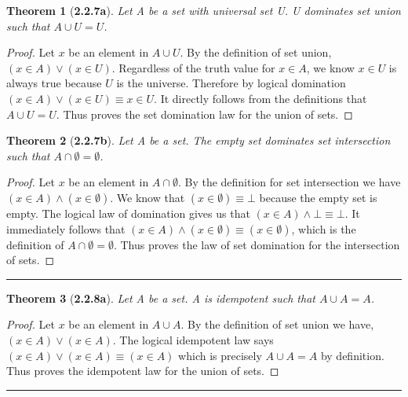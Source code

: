 \documentclass[a4paper, 12pt]{article}
\theoremstyle{plain}
\newtheorem*{theorem*}{Theorem}
\begin{document}
\begin{theorem*}[\textbf{2.2.7a}]
    Let A be a set with universal set U. U dominates set union such that $A \cup U = U$.
\end{theorem*}

\begin{proof}
    Let $x$ be an element in $A \cup U$. By the definition of set union, \newline 
    $(x \in A) \lor (x \in U)$. Regardless of the truth value for $x \in A$, we know 
    $x \in U$ is always true because $U$ is the universe. Therefore by logical domination 
    $(x \in A) \lor (x \in U) \equiv x \in U$. It directly follows from the definitions 
    that $A \cup U = U$. Thus proves the set domination law for the union of sets.
\end{proof}

\pagebreak


\begin{theorem*}[\textbf{2.2.7b}]
    Let A be a set. The empty set dominates set intersection such that $A \cap \emptyset = \emptyset$.
\end{theorem*}

\begin{proof}
    Let $x$ be an element in $A \cap \emptyset$. By the definition for set intersection we have 
    $(x \in A) \land (x \in \emptyset)$. We know that $(x \in \emptyset) \equiv \bot$ because 
    the empty set is empty. The logical law of domination gives us that 
    $(x \in A) \land \bot \equiv \bot$. It immediately follows that 
    $(x \in A) \land (x \in \emptyset) \equiv (x \in \emptyset)$, which is the definition of 
    $A \cap \emptyset = \emptyset$. Thus proves the law of set domination for the intersection 
    of sets. 
\end{proof}
\begin{center}
    \rule{5.4in}{1pt}
\end{center}


\begin{theorem*}[\textbf{2.2.8a}]
    Let A be a set. A is idempotent such that $A \cup A = A$.
\end{theorem*}

\begin{proof}
    Let $x$ be an element in $A \cup A$. By the definition of set union we have, \newline 
    $(x \in A) \lor (x \in A)$. The logical idempotent law says \newline 
    $(x \in A) \lor (x \in A) \equiv (x \in A)$ which is precisely $A \cup A = A$ by definition. 
    Thus proves the idempotent law for the union of sets.
\end{proof}
\begin{center}
    \rule{5.4in}{1pt}
\end{center}
\end{document}

